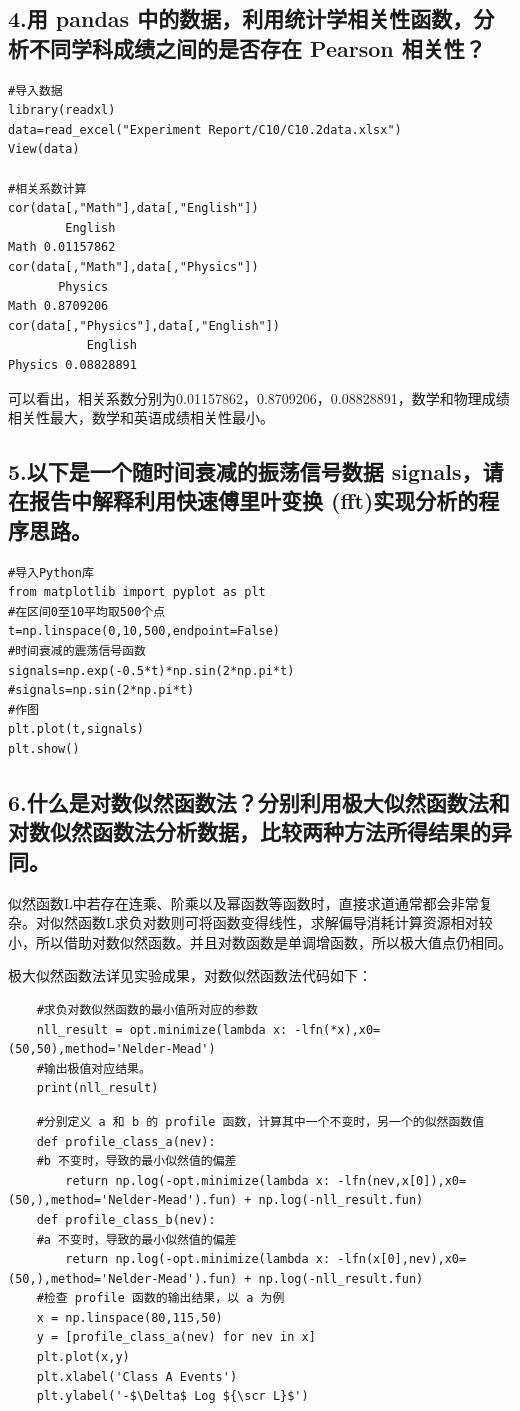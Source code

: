 \documentclass[10pt,a4paper,twoside,UTF8]{ctexart}
\begin{document}
\subsection*{4.用 pandas 中的数据，利用统计学相关性函数，分析不同学科成绩之间的是否存在
Pearson 相关性？
}

\begin{lstlisting}
#导入数据
library(readxl)
data=read_excel("Experiment Report/C10/C10.2data.xlsx")
View(data)

#相关系数计算
cor(data[,"Math"],data[,"English"])
        English
Math 0.01157862
cor(data[,"Math"],data[,"Physics"])
       Physics
Math 0.8709206
cor(data[,"Physics"],data[,"English"])
           English
Physics 0.08828891
\end{lstlisting}

可以看出，相关系数分别为0.01157862，0.8709206，0.08828891，数学和物理成绩相关性最大，数学和英语成绩相关性最小。

\subsection*{5.以下是一个随时间衰减的振荡信号数据 signals，请在报告中解释利用快速傅里叶变换
(fft)实现分析的程序思路。}
\begin{lstlisting}
#导入Python库
from matplotlib import pyplot as plt
#在区间0至10平均取500个点
t=np.linspace(0,10,500,endpoint=False)
#时间衰减的震荡信号函数
signals=np.exp(-0.5*t)*np.sin(2*np.pi*t)
#signals=np.sin(2*np.pi*t)
#作图
plt.plot(t,signals)
plt.show()
\end{lstlisting}

\subsection*{6.什么是对数似然函数法？分别利用极大似然函数法和对数似然函数法分析数据，比较两种方法所得结果的异同。}
似然函数L中若存在连乘、阶乘以及幂函数等函数时，直接求道通常都会非常复杂。对似然函数L求负对数则可将函数变得线性，求解偏导消耗计算资源相对较小，所以借助对数似然函数。并且对数函数是单调增函数，所以极大值点仍相同。

极大似然函数法详见实验成果，对数似然函数法代码如下：
\begin{lstlisting}
	#求负对数似然函数的最小值所对应的参数
	nll_result = opt.minimize(lambda x: -lfn(*x),x0=(50,50),method='Nelder-Mead')
	#输出极值对应结果。
	print(nll_result)
\end{lstlisting}
\begin{lstlisting}
	#分别定义 a 和 b 的 profile 函数，计算其中一个不变时，另一个的似然函数值
	def profile_class_a(nev):
	#b 不变时，导致的最小似然值的偏差
		return np.log(-opt.minimize(lambda x: -lfn(nev,x[0]),x0=(50,),method='Nelder-Mead').fun) + np.log(-nll_result.fun)
	def profile_class_b(nev):
	#a 不变时，导致的最小似然值的偏差
		return np.log(-opt.minimize(lambda x: -lfn(x[0],nev),x0=(50,),method='Nelder-Mead').fun) + np.log(-nll_result.fun)
	#检查 profile 函数的输出结果，以 a 为例
	x = np.linspace(80,115,50)
	y = [profile_class_a(nev) for nev in x]
	plt.plot(x,y)
	plt.xlabel('Class A Events')
	plt.ylabel('-$\Delta$ Log ${\scr L}$')
\end{lstlisting}
\end{document}

